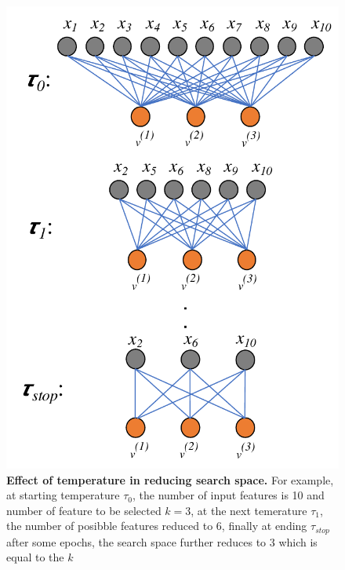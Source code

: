 \documentclass{bioinfo}
\begin{document}
\begin{figure}[h!]
    \centering
    \includegraphics[scale=0.5]{fig/temp-change.pdf}
    \caption{\textbf{Effect of temperature in reducing search space.} For example, at starting temperature $\tau_0$, the number of input features is 10 and number of feature to be selected $k=3$, at the next temerature $\tau_1$, the number of posibble features reduced to 6, finally at ending $\tau_{stop}$ after some epochs, the search space further reduces to 3 which is equal to the $k$}
    \label{fig:temp-change}
\end{figure}
\end{document}
